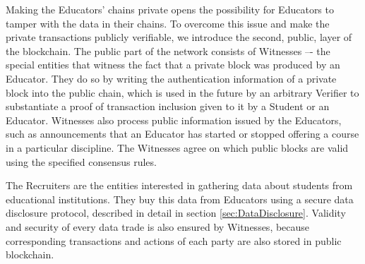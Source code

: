 Making the Educators' chains private opens the possibility for Educators to tamper with the data in their chains. To overcome this issue and make the private transactions publicly verifiable, we introduce the second, public, layer of the blockchain. The public part of the network consists
of Witnesses –- the special entities that witness the fact that a private block was produced by an Educator.
They do so by writing the authentication information of a private block into the public chain, which is used in the future by an arbitrary Verifier to substantiate a proof of transaction inclusion given to it by a Student or an Educator. Witnesses also process public information issued by the Educators, such as announcements that an Educator has started or stopped offering a course in a particular discipline. The Witnesses agree on which public blocks are valid using the specified consensus rules.

The Recruiters are the entities interested in gathering data about students from educational institutions. They buy this data from Educators using a secure data disclosure protocol, described in detail in section \ref{sec:DataDisclosure}. Validity and security of every data trade is also ensured by Witnesses, because corresponding transactions and actions of each party are also stored in public blockchain.
